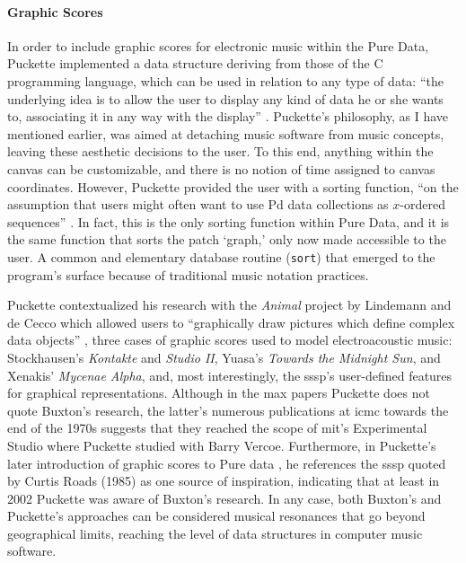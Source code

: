 \paragraph{Graphic Scores}
\label{graphic_scores}
In order to include graphic scores for electronic music within the Pure Data, Puckette implemented a data structure deriving from those of the C programming language, which can be used in relation to any type of data: ``the underlying idea is to allow the user to display any kind of data he or she wants to, associating it in any way with the display'' \parencite[184]{DBLP:conf/icmc/Puckette02}. Puckette's philosophy, as I have mentioned earlier, was aimed at detaching music software from music concepts, leaving these aesthetic decisions to the user. To this end, anything within the canvas can be customizable, and there is no notion of time assigned to canvas coordinates. However, Puckette provided the user with a sorting function, ``on the assumption that users might often want to use Pd data collections as $x$-ordered sequences'' \parencite[185]{DBLP:conf/icmc/Puckette02}. In fact, this is the only sorting function within Pure Data, and it is the same function that sorts the patch `graph,' only now made accessible to the user. A common and elementary database routine (\texttt{sort}) that emerged to the program's surface because of traditional music notation practices.

Puckette contextualized his research with the \textit{Animal} project by Lindemann and de Cecco which allowed users to ``graphically draw pictures which define complex data objects'' \parencite{DBLP:conf/icmc/Lindemann90a}, three cases of graphic scores used to model electroacoustic music: Stockhausen's \textit{Kontakte} and \textit{Studio II}, Yuasa's \textit{Towards the Midnight Sun}, and Xenakis' \textit{Mycenae Alpha}, and, most interestingly, the \gls{sssp}'s user-defined features for graphical representations. Although in the \gls{max} papers Puckette does not quote Buxton's research, the latter's numerous publications at \gls{icmc} towards the end of the 1970s suggests that they reached the scope of \gls{mit}'s Experimental Studio where Puckette studied with Barry Vercoe. Furthermore, in Puckette's later introduction of graphic scores to Pure data \parencite{DBLP:conf/icmc/Puckette02} , he references the \gls{sssp} quoted by Curtis Roads (1985) as one source of inspiration, indicating that at least in 2002 Puckette was aware of Buxton's research. In any case, both Buxton's and Puckette's approaches can be considered musical resonances that go beyond geographical limits, reaching the level of data structures in computer music software.

